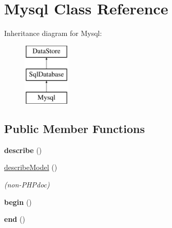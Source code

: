 \hypertarget{class_mysql}{
\section{Mysql Class Reference}
\label{class_mysql}
}
Inheritance diagram for Mysql:\begin{figure}[H]
\begin{center}
\leavevmode
\includegraphics[height=3.000000cm]{class_mysql}
\end{center}
\end{figure}
\subsection*{Public Member Functions}
\begin{DoxyCompactItemize}
\item 
\hypertarget{class_mysql_a33d54bf505e320f70e69ac2b644ae159}{
{\bfseries describe} ()}
\label{class_mysql_a33d54bf505e320f70e69ac2b644ae159}

\item 
\hyperlink{class_mysql_a798640de095575605ef6a0b0b9f98192}{describeModel} ()
\begin{DoxyCompactList}\small\item\em (non-\/PHPdoc) \item\end{DoxyCompactList}\item 
\hypertarget{class_mysql_a385aeb4242205198dd59a7966656cb11}{
{\bfseries begin} ()}
\label{class_mysql_a385aeb4242205198dd59a7966656cb11}

\item 
\hypertarget{class_mysql_aa9d528bfe0d8cf2bb55eb38f1df037ee}{
{\bfseries end} ()}
\label{class_mysql_aa9d528bfe0d8cf2bb55eb38f1df037ee}

\end{DoxyCompactItemize}
